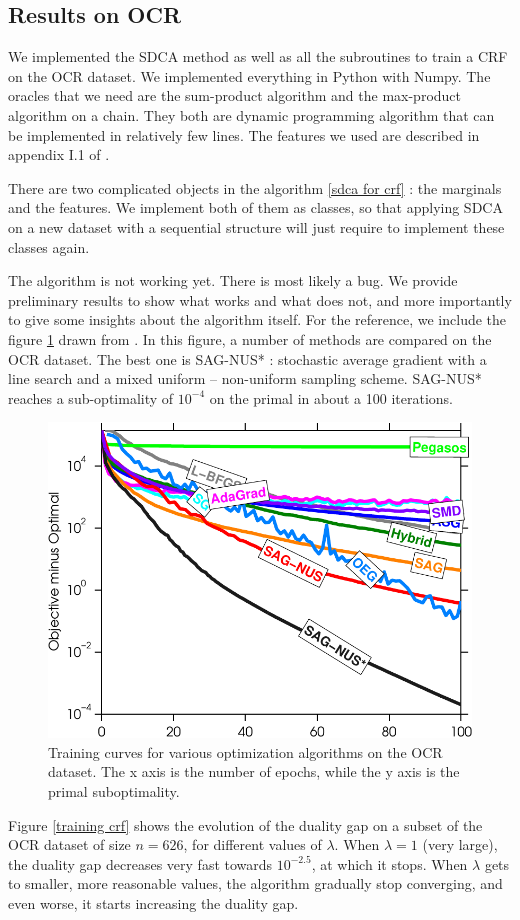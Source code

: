 \documentclass{article}
\DeclareMathOperator{\1}{\mathbb{1}}
\begin{document}
\subsection{Results on OCR}

We implemented the SDCA method as well as all the subroutines to train a CRF on the OCR dataset.
We implemented everything in Python with Numpy.
The oracles that we need are the sum-product algorithm and the max-product algorithm on a chain.
They both are dynamic programming algorithm that can be implemented in relatively few lines.
The features we used are described in appendix I.1 of \cite{osokin_minding_2016}.

There are two complicated objects in the algorithm \ref{sdca for crf} : the marginals and the features.
We implement both of them as classes, so that applying SDCA on a  new dataset with a sequential structure will just require to implement these classes again.

The algorithm is not working yet.
There is most likely a bug.
We provide preliminary results to show what works and what does not, and more importantly to give some insights about the algorithm itself. 
For the reference, we include the figure \ref{schmidt's curves} drawn from \cite{schmidt_non-uniform_2015}.
In this figure, a number of methods are compared on the OCR dataset.
The best one is SAG-NUS* : stochastic average gradient with a line search and a mixed uniform -- non-uniform sampling scheme.
SAG-NUS* reaches a sub-optimality of $10^{-4}$ on the primal in about a 100 iterations.

\begin{figure}[ht]
	\center
	\includegraphics[width=.5\textwidth]{images/ocr2_train_passes.pdf}
	\caption{Training curves for various optimization algorithms on the OCR dataset. The x axis is the number of epochs, while the y axis is the primal suboptimality.}
	\label{schmidt's curves}
\end{figure}


Figure \ref{training crf} shows the evolution of the duality gap on a subset  of  the OCR dataset  of size $n=626$, for different values of $\lambda$.
When $\lambda=1$ (very large), the duality gap decreases very fast towards $10^{-2.5}$, at which it stops.
When $\lambda$ gets to smaller, more reasonable values, the algorithm gradually stop converging, and even worse, it starts increasing the duality gap.
\end{document}
